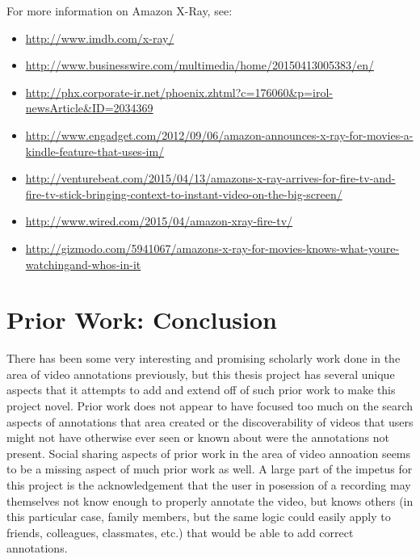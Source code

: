 For more information on Amazon X-Ray, see: 

\begin{itemize}
\item \url{http://www.imdb.com/x-ray/}
\item \url{http://www.businesswire.com/multimedia/home/20150413005383/en/}
\item \url{http://phx.corporate-ir.net/phoenix.zhtml?c=176060&p=irol-newsArticle&ID=2034369}
\item \url{http://www.engadget.com/2012/09/06/amazon-announces-x-ray-for-movies-a-kindle-feature-that-uses-im/}
\item \url{http://venturebeat.com/2015/04/13/amazons-x-ray-arrives-for-fire-tv-and-fire-tv-stick-bringing-context-to-instant-video-on-the-big-screen/}
\item \url{http://www.wired.com/2015/04/amazon-xray-fire-tv/}
\item \url{http://gizmodo.com/5941067/amazons-x-ray-for-movies-knows-what-youre-watchingand-whos-in-it}
\end{itemize}








\section{Prior Work: Conclusion}
\label{sec:priorwork:conclusion}

There has been some very interesting and promising scholarly work done in the area of video annotations previously, but this thesis project has several unique aspects that it attempts to add and extend off of such prior work to make this project novel. Prior work does not appear to have focused too much on the search aspects of annotations that area created or the discoverability of videos that users might not have otherwise ever seen or known about were the annotations not present.  Social sharing aspects of prior work in the area of video annoation seems to be a missing aspect of much prior work as well.  A large part of the impetus for this project is the acknowledgement that the user in posession of a recording may themselves not know enough to properly annotate the video, but knows others (in this particular case, family members, but the same logic could easily apply to friends, colleagues, classmates, etc.) that would be able to add correct annotations.

